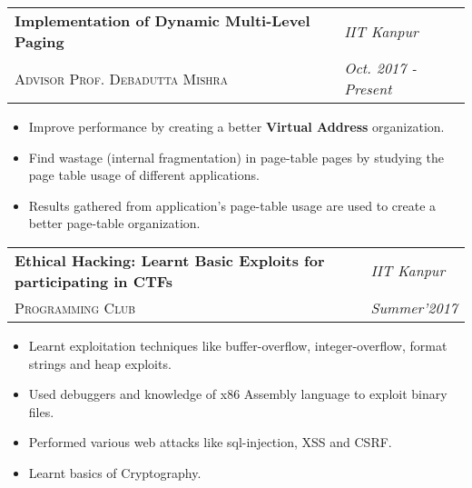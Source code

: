 \documentclass[11pt]{article}
\let\bold\textbf
\let\ital\textit
\let\smca\textsc
\begin{document}
\begin{tabu} to \textwidth {l X[r]}
  \bold{Implementation of Dynamic Multi-Level Paging} & {\scriptsize{}\selectfont\ital{IIT Kanpur}} \\
  {\footnotesize\color{lightgrey}\smca{Advisor Prof. Debadutta Mishra}} & {\scriptsize{}\selectfont\ital{Oct. 2017 - Present}} 
\end{tabu}
{\footnotesize{}\selectfont\begin{itemize} %
        \item {Improve performance by creating a better \textbf{Virtual Address} organization.}
        \item {Find wastage (internal fragmentation) in page-table pages by studying the page table usage of different applications.}
        \item {Results gathered from application's page-table usage are used to create a better page-table organization.}

\end{itemize}}
\newpage
\noindent\begin{tabu} to \textwidth {l X[r]}
  \bold{Ethical Hacking: Learnt Basic Exploits for participating in CTFs} & {\scriptsize{}\selectfont\ital{IIT Kanpur}} \\
  {\footnotesize\color{lightgrey}\smca{Programming Club}} & {\scriptsize{}\selectfont\ital{Summer'2017}} 
\end{tabu}
{\footnotesize{}\selectfont\begin{itemize} %
        \item {Learnt exploitation techniques like buffer-overflow, integer-overflow, format strings and heap exploits.}
        \item {Used debuggers and knowledge of x86 Assembly language to exploit binary files.}
        \item {Performed various web attacks like sql-injection, XSS and CSRF.}
        \item {Learnt basics of Cryptography.}
\end{itemize}}
\end{document}

